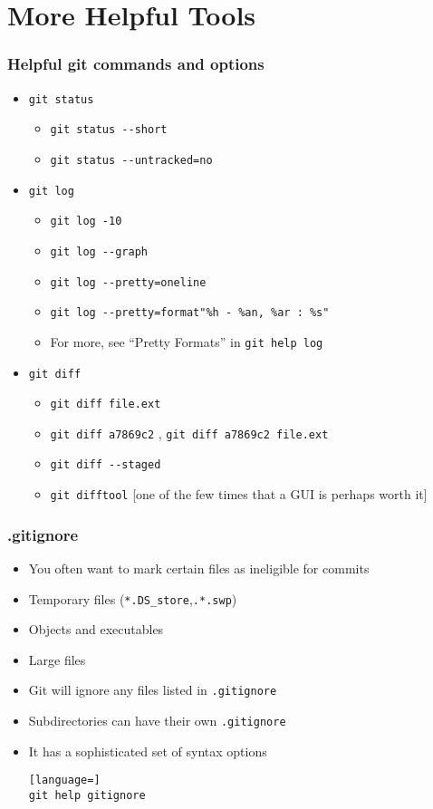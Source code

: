 \documentclass{beamer}
\begin{document}
\section{More Helpful Tools}
\begin{frame}[fragile]
\frametitle{Helpful git commands and options}
\begin{itemize}
\item \lstinline{git status}
\begin{itemize}
\item \lstinline{git status --short}
\item \lstinline{git status --untracked=no}
\end{itemize}
\item \lstinline{git log}
\begin{itemize}
\item \lstinline{git log -10}
\item \lstinline{git log --graph}
\item \lstinline{git log --pretty=oneline}
\item \lstinline{git log --pretty=format"%h - %an, %ar : %s"}
\item For more, see ``Pretty Formats'' in \lstinline{git help log}
\end{itemize}
\item \lstinline{git diff}
\begin{itemize}
\item \lstinline{git diff file.ext}
\item \lstinline{git diff a7869c2} , \lstinline{git diff a7869c2 file.ext}
\item \lstinline{git diff --staged}
\item \lstinline{git difftool} [one of the few times that a GUI is perhaps worth it]
\end{itemize}
\end{itemize}
\end{frame}

\begin{frame}[fragile]
\frametitle{.gitignore}
\begin{itemize}
\item You often want to mark certain files as ineligible for commits
\item Temporary files (\lstinline{*.DS_store},\lstinline{.*.swp})
\item Objects and executables
\item Large files
\item Git will ignore any files listed in \lstinline{.gitignore}
\item Subdirectories can have their own \lstinline{.gitignore}
\item It has a sophisticated set of syntax options
\begin{lstlisting}[language=]
git help gitignore
\end{lstlisting}
\end{itemize}
\end{frame}
\end{document}

